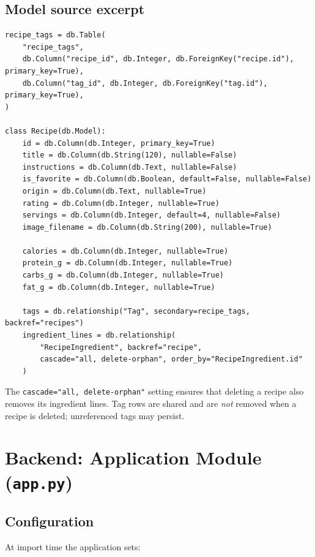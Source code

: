 \documentclass[11pt,a4paper]{article}
\newcommand{\code}[1]{\texttt{#1}}
\begin{document}
\subsection{Model source excerpt}
\begin{lstlisting}[caption={model.py --- relationships and constraints (abridged)}]
recipe_tags = db.Table(
    "recipe_tags",
    db.Column("recipe_id", db.Integer, db.ForeignKey("recipe.id"), primary_key=True),
    db.Column("tag_id", db.Integer, db.ForeignKey("tag.id"), primary_key=True),
)

class Recipe(db.Model):
    id = db.Column(db.Integer, primary_key=True)
    title = db.Column(db.String(120), nullable=False)
    instructions = db.Column(db.Text, nullable=False)
    is_favorite = db.Column(db.Boolean, default=False, nullable=False)
    origin = db.Column(db.Text, nullable=True)
    rating = db.Column(db.Integer, nullable=True)
    servings = db.Column(db.Integer, default=4, nullable=False)
    image_filename = db.Column(db.String(200), nullable=True)

    calories = db.Column(db.Integer, nullable=True)
    protein_g = db.Column(db.Integer, nullable=True)
    carbs_g = db.Column(db.Integer, nullable=True)
    fat_g = db.Column(db.Integer, nullable=True)

    tags = db.relationship("Tag", secondary=recipe_tags, backref="recipes")
    ingredient_lines = db.relationship(
        "RecipeIngredient", backref="recipe",
        cascade="all, delete-orphan", order_by="RecipeIngredient.id"
    )
\end{lstlisting}

The \code{cascade="all, delete-orphan"} setting ensures that deleting a recipe
also removes its ingredient lines. Tag rows are shared and are \emph{not}
removed when a recipe is deleted; unreferenced tags may persist.

\section{Backend: Application Module (\texttt{app.py})}

\subsection{Configuration}
At import time the application sets:
\end{document}
